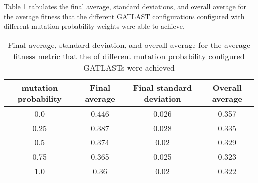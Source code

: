 Table \ref{tab:HP:GA:mutationProp:average fitness} tabulates the final average, standard deviations, and overall average for the average fitness that the different GATLAST configurations configured with different mutation probability weights were able to achieve.
\begin{table}[tbh!]
\centering
\begin{adjustbox}{trim=0cm 0cm 0cm 0cm, clip=true}
\begin{tabular}{|c|c|c|c|}
\hline
mutation probability & Final average & Final standard deviation & Overall average\\
\hline
0.0 & 0.446 & 0.026 & 0.357\\\hline
0.25 & 0.387 & 0.028 & 0.335\\\hline
0.5 & 0.374 & 0.02 & 0.329\\\hline
0.75 & 0.365 & 0.025 & 0.323\\\hline
1.0 & 0.36 & 0.02 & 0.322\\\hline
\end{tabular}
\end{adjustbox}
\caption{Final average, standard deviation, and overall average for the average fitness metric that the of different mutation probability configured GATLASTs were achieved}
\label{tab:HP:GA:mutationProp:average fitness}
\end{table}